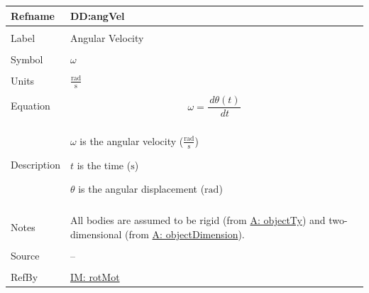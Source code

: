 \documentclass[12pt]{article}
\begin{document}
\vspace{\baselineskip}
\noindent
\begin{minipage}{\textwidth}
\begin{tabular}{>{\raggedright}p{}>{\raggedright\arraybackslash}p{}}
\toprule \textbf{Refname} & \textbf{DD:angVel}
\label{DD:angVel}
\\ \midrule \\
Label & Angular Velocity
        
\\ \midrule \\
Symbol & $ω$
         
\\ \midrule \\
Units & $\frac{\text{rad}}{\text{s}}$
        
\\ \midrule \\
Equation & \begin{displaymath}
           ω=\frac{\,dθ\left(t\right)}{\,dt}
           \end{displaymath}
\\ \midrule \\
Description & \begin{symbDescription}
              \item{$ω$ is the angular velocity ($\frac{\text{rad}}{\text{s}}$)}
              \item{$t$ is the time (${\text{s}}$)}
              \item{$θ$ is the angular displacement (${\text{rad}}$)}
              \end{symbDescription}
\\ \midrule \\
Notes & All bodies are assumed to be rigid (from \hyperref[assumpOT]{A: objectTy}) and two-dimensional (from \hyperref[assumpOD]{A: objectDimension}).
        
\\ \midrule \\
Source & --
         
\\ \midrule \\
RefBy & \hyperref[IM:rotMot]{IM: rotMot}
        
\\ \bottomrule
\end{tabular}
\end{minipage}
\end{document}
